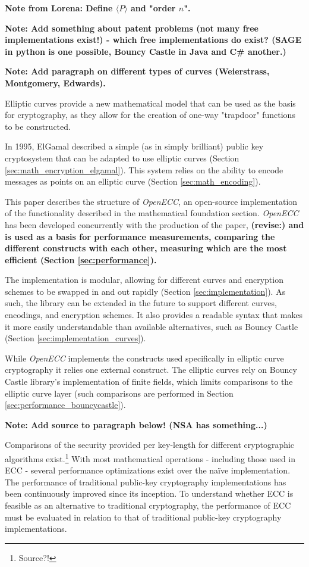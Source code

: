 \textbf{Note from Lorena: Define \(\langle P \rangle\) and "order \(n\)".}

\textbf{Note: Add something about patent problems (not many free implementations exist!) - which free
implementations do exist? (SAGE in python is one possible, Bouncy Castle in Java and C\# another.)}

\textbf{Note: Add paragraph on different types of curves (Weierstrass, Montgomery, Edwards).}

Elliptic curves provide a new mathematical model that can be used as the basis for cryptography,
as they allow for the creation of one-way "trapdoor" functions to be constructed.

In 1995, ElGamal described a simple (as in simply brilliant) public key cryptosystem that can be adapted
to use elliptic curves (Section \ref{sec:math_encryption_elgamal}). This system relies on the ability to
encode messages as points on an elliptic curve (Section \ref{sec:math_encoding}).

This paper describes the structure of \emph{OpenECC}, an open-source implementation of the functionality
described in the mathematical foundation section. \emph{OpenECC} has been developed concurrently with the
production of the paper, \textbf{(revise:) and is used as a basis for performance measurements, comparing the different constructs
with each other, measuring which are the most efficient (Section \ref{sec:performance}).}

The implementation is modular, allowing for different curves and encryption schemes to be swapped in and out
rapidly (Section \ref{sec:implementation}). As such, the library can be extended in the future to support different
curves, encodings, and encryption schemes. It also provides a readable syntax that makes it more easily
understandable than available alternatives, such as Bouncy Castle (Section \ref{sec:implementation_curves}).

While \emph{OpenECC} implements the constructs used specifically in elliptic curve cryptography it relies one external construct.
The elliptic curves rely on Bouncy Castle library's implementation of finite fields, which limits comparisons to the elliptic curve
layer (such comparisons are performed in Section \ref{sec:performance_bouncycastle}).

\textbf{Note: Add source to paragraph below! (NSA has something...)}

Comparisons of the security provided per key-length for different cryptographic algorithms exist.\footnote{Source?!} With
most mathematical operations - including those used in ECC - several performance optimizations exist over the naïve
implementation. The performance of traditional public-key cryptography implementations has been continuously improved
since its inception. To understand whether ECC is feasible as an alternative to traditional cryptography, the performance
of ECC must be evaluated in relation to that of traditional public-key cryptography implementations.

